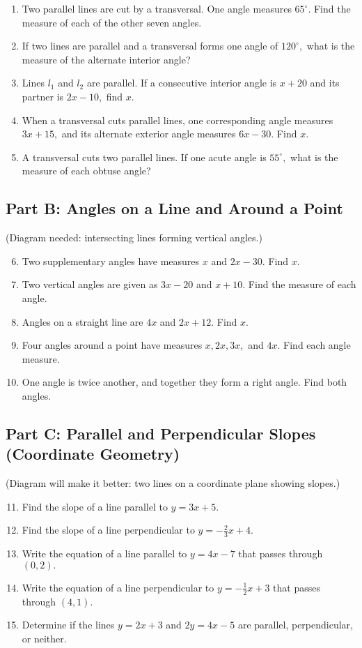 \documentclass[12pt]{article}
\begin{document}
\begin{enumerate}
  \item Two parallel lines are cut by a transversal. One angle measures \(65^\circ.\) Find the measure of each of the other seven angles.
  \item If two lines are parallel and a transversal forms one angle of \(120^\circ,\) what is the measure of the alternate interior angle?
  \item Lines \(l_1\) and \(l_2\) are parallel. If a consecutive interior angle is \(x + 20\) and its partner is \(2x - 10,\) find \(x.\)
  \item When a transversal cuts parallel lines, one corresponding angle measures \(3x + 15,\) and its alternate exterior angle measures \(6x - 30.\) Find \(x.\)
  \item A transversal cuts two parallel lines. If one acute angle is \(55^\circ,\) what is the measure of each obtuse angle?
\end{enumerate}

\subsection*{Part B: Angles on a Line and Around a Point}
(Diagram needed: intersecting lines forming vertical angles.)

\begin{enumerate}
  \setcounter{enumi}{5}
  \item Two supplementary angles have measures \(x\) and \(2x - 30.\) Find \(x.\)
  \item Two vertical angles are given as \(3x - 20\) and \(x + 10.\) Find the measure of each angle.
  \item Angles on a straight line are \(4x\) and \(2x + 12.\) Find \(x.\)
  \item Four angles around a point have measures \(x, 2x, 3x,\) and \(4x.\) Find each angle measure.
  \item One angle is twice another, and together they form a right angle. Find both angles.
\end{enumerate}

\subsection*{Part C: Parallel and Perpendicular Slopes (Coordinate Geometry)}
(Diagram will make it better: two lines on a coordinate plane showing slopes.)

\begin{enumerate}
  \setcounter{enumi}{10}
  \item Find the slope of a line parallel to \(y = 3x + 5.\)
  \item Find the slope of a line perpendicular to \(y = -\frac{2}{3}x + 4.\)
  \item Write the equation of a line parallel to \(y = 4x - 7\) that passes through \((0, 2).\)
  \item Write the equation of a line perpendicular to \(y = -\tfrac{1}{2}x + 3\) that passes through \((4, 1).\)
  \item Determine if the lines \(y = 2x + 3\) and \(2y = 4x - 5\) are parallel, perpendicular, or neither.
\end{enumerate}
\end{document}
